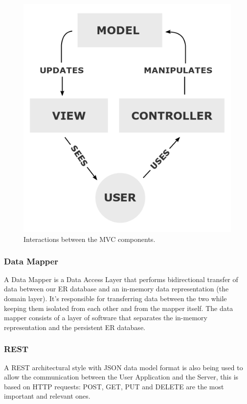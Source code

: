 \documentclass[12pt]{article}
\begin{document}
\begin{figure}[H]
    \centering
    \includegraphics[scale=0.45]{MVC-Process.png}
    \caption{Interactions between the MVC components.}
    \label{fig:MVC-Process}
\end{figure}

\subsubsection{Data Mapper}
A Data Mapper is a Data Access Layer that performs bidirectional transfer of data between our ER 
database and an in-memory data representation (the domain layer). It's responsible 
for transferring data between the two while keeping them isolated from each other and from the mapper
itself. The data mapper consists of a layer of software that separates the in-memory representation and 
the persistent ER database. 

\subsubsection{REST}
A REST architectural style with JSON data model format is also being used to allow the communication 
between the User Application and the Server, this is based on HTTP requests: POST, GET, PUT and 
DELETE are the most important and relevant ones.
\end{document}
